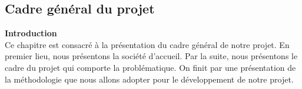 \begin{center}
    \chapter{Cadre général du projet}
\end{center}


\textbf{\huge Introduction} \\[1cm]




\textsf{\LARGE 
Ce chapitre est consacré à la présentation du cadre général de notre projet. En premier lieu, nous présentons la société d’accueil. Par la suite, nous présentons le cadre du projet qui comporte la problématique. On finit par une présentation de la méthodologie que nous allons adopter pour le développement de notre projet.}\\[1cm]




